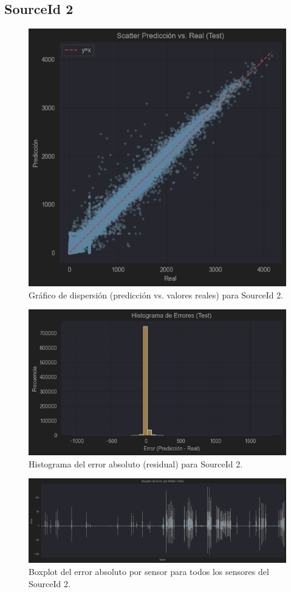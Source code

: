 \subsection*{SourceId 2}

\begin{figure}[H]
	\centering
	\includegraphics[width=0.75\linewidth]{includes/cap5/graphs/advanced/sid2_scatter_predicted_vs_actual.png}
	\caption{Gráfico de dispersión (predicción vs. valores reales) para SourceId 2.}
	\label{fig:sid2_scatter}
\end{figure}

\begin{figure}[H]
	\centering
	\includegraphics[width=0.75\linewidth]{includes/cap5/graphs/advanced/sid2_error_histogram_predicted_vs_actual.png}
	\caption{Histograma del error absoluto (residual) para SourceId 2.}
	\label{fig:sid2_histograma_error}
\end{figure}

\begin{figure}[H]
	\centering
	\includegraphics[width=0.75\linewidth]{includes/cap5/graphs/advanced/sid2_all_meters_error_boxplot.png}
	\caption{Boxplot del error absoluto por sensor para todos los sensores del SourceId 2.}
	\label{fig:sid2_boxplot_all}
\end{figure}

